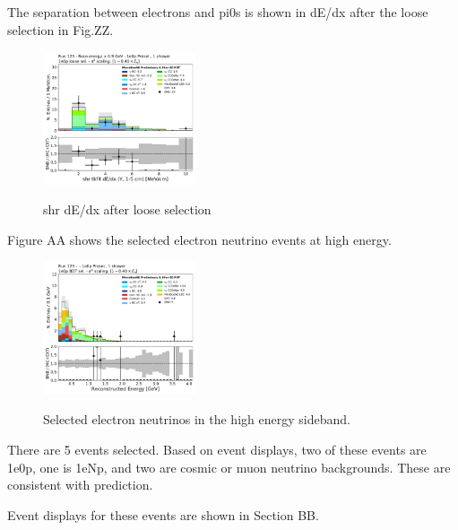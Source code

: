 The separation between electrons and pi0s is shown in dE/dx after the loose selection in Fig.ZZ.

\begin{figure}[H]
    \centering
    \includegraphics[width=0.4\textwidth]{1e0p/High_E_Sideband/loose_selection/shr_tkfit_gap10_dedx_Y.pdf}
    \caption{shr dE/dx after loose selection}
    \caption{} 
    \label{fig:HE_1eNp_1}
\end{figure}

Figure AA shows the selected electron neutrino events at high energy.
\begin{figure}[H]
    \centering
    \includegraphics[width=0.4\textwidth]{1e0p/High_E_Sideband/BDT_selection/reco_e_07272020.pdf}
    \caption{Selected electron neutrinos in the high energy sideband.}
    \caption{} 
    \label{fig:HE_1eNp_1}
\end{figure}

There are 5 events selected.  Based on event displays, two of these events are 1e0p, one is 1eNp, and two are cosmic or muon neutrino backgrounds.  These are consistent with prediction.

Event displays for these events are shown in Section BB.

